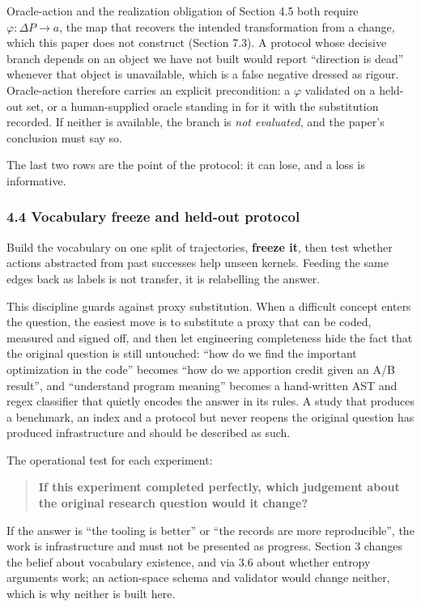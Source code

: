 \documentclass[
  11pt,
]{article}
\begin{document}
Oracle-action and the realization obligation of Section 4.5 both require \(\varphi : \Delta P \to a\), the map that recovers the intended transformation from a change, which this paper does not construct (Section 7.3). A protocol whose decisive branch depends on an object we have not built would report ``direction is dead'' whenever that object is unavailable, which is a false negative dressed as rigour. Oracle-action therefore carries an explicit precondition: a \(\varphi\) validated on a held-out set, or a human-supplied oracle standing in for it with the substitution recorded. If neither is available, the branch is \emph{not evaluated}, and the paper's conclusion must say so.

The last two rows are the point of the protocol: it can lose, and a loss is informative.

\hypertarget{vocabulary-freeze-and-held-out-protocol}{%
\subsubsection{4.4 Vocabulary freeze and held-out protocol}\label{vocabulary-freeze-and-held-out-protocol}}

Build the vocabulary on one split of trajectories, \textbf{freeze it}, then test whether actions abstracted from past successes help unseen kernels. Feeding the same edges back as labels is not transfer, it is relabelling the answer.

This discipline guards against proxy substitution. When a difficult concept enters the question, the easiest move is to substitute a proxy that can be coded, measured and signed off, and then let engineering completeness hide the fact that the original question is still untouched: ``how do we find the important optimization in the code'' becomes ``how do we apportion credit given an A/B result'', and ``understand program meaning'' becomes a hand-written AST and regex classifier that quietly encodes the answer in its rules. A study that produces a benchmark, an index and a protocol but never reopens the original question has produced infrastructure and should be described as such.

The operational test for each experiment:

\begin{quote}
\textbf{If this experiment completed perfectly, which judgement about the original research question would it change?}
\end{quote}

If the answer is ``the tooling is better'' or ``the records are more reproducible'', the work is infrastructure and must not be presented as progress. Section 3 changes the belief about vocabulary existence, and via 3.6 about whether entropy arguments work; an action-space schema and validator would change neither, which is why neither is built here.
\end{document}
